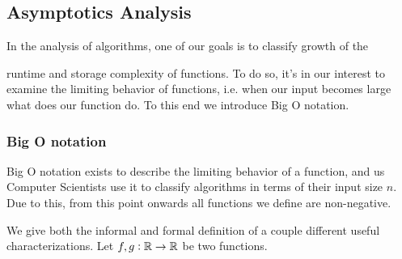 
\subsection{Asymptotics Analysis}

In the analysis of algorithms, one of our goals is to classify growth of the

runtime and storage complexity of functions. To do so, it's in our interest to
examine the limiting behavior of functions, i.e. when our input becomes large
what does our function do. To this end we introduce Big O notation.

\subsubsection{Big O notation}

Big O notation exists to describe the limiting behavior of a function, and us
Computer Scientists use it to classify algorithms in terms of their input size
$n$. Due to this, from this point onwards all functions we define are
non-negative. 

We give both the informal and formal definition of a couple different
useful characterizations. Let $f,g : \mathbb{R} \to \mathbb{R}$ be two functions.

